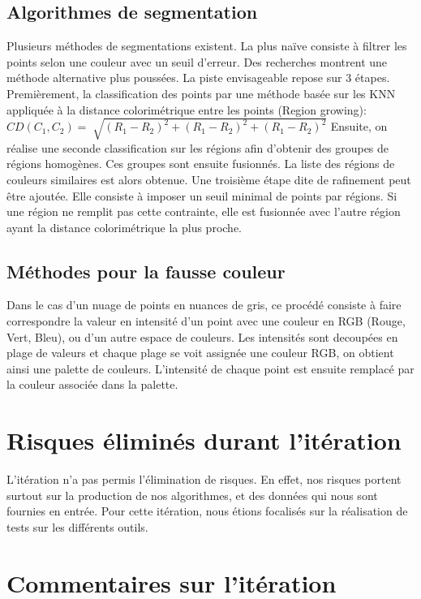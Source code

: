 \documentclass[12pt,titlepage,french]{article}
\begin{document}
\subsection{Algorithmes de segmentation}
Plusieurs méthodes de segmentations existent. La plus naïve consiste à filtrer les points selon une couleur avec un seuil d'erreur.
Des recherches montrent une méthode alternative plus poussées.
La piste envisageable repose sur 3 étapes.
Premièrement, la classification des points par une méthode basée sur les KNN appliquée à la distance colorimétrique entre les points (Region growing):
$
CD(C_1,C_2)=\sqrt[]{(R_1-R_2)^2 + (R_1-R_2)^2 + (R_1-R_2)^2}
$
Ensuite, on réalise une seconde classification sur les régions afin d'obtenir des groupes de régions homogènes.
Ces groupes sont ensuite fusionnés. La liste des régions de couleurs similaires est alors obtenue.
Une troisième étape dite de rafinement peut être ajoutée. Elle consiste à imposer un seuil minimal de points par régions.
Si une région ne remplit pas cette contrainte, elle est fusionnée avec l'autre région ayant la distance colorimétrique la plus proche.

\subsection{Méthodes pour la fausse couleur}
Dans le cas d'un nuage de points en nuances de gris, ce procédé consiste à faire correspondre la valeur en intensité d'un point avec une couleur en RGB (Rouge, Vert, Bleu), ou d'un autre espace de couleurs.
Les intensités sont decoupées en plage de valeurs et chaque plage se voit assignée une couleur RGB, on obtient ainsi une palette de couleurs. L'intensité de chaque point est ensuite remplacé par la couleur associée dans la palette.

\section{Risques éliminés durant l'itération}
L'itération n'a pas permis l'élimination de risques. En effet, nos risques portent surtout sur la production de nos algorithmes, et des données qui nous sont fournies en entrée. Pour cette itération, nous étions focalisés sur la réalisation de tests sur les différents outils.

\section{Commentaires sur l'itération}
\end{document}
